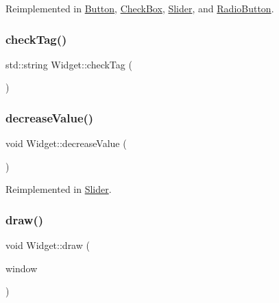 Reimplemented in \mbox{\hyperlink{class_button_a73a90ae2e4101b7d28d24c1c8ec905db}{Button}}, \mbox{\hyperlink{class_check_box_acc7a00bdaa6ee316e7622a52733be294}{Check\+Box}}, \mbox{\hyperlink{class_slider_ab81e90562123cacd8f624b326b9b3f3e}{Slider}}, and \mbox{\hyperlink{class_radio_button_a693581ddb77b4f4c5f8e133eb1369390}{Radio\+Button}}.

\mbox{\label{class_widget_aea8a06cb0344180c07346dbad25a8fdf}} 
\subsubsection{\texorpdfstring{checkTag()}{checkTag()}}
{\footnotesize\ttfamily std\+::string Widget\+::check\+Tag (\begin{DoxyParamCaption}{ }\end{DoxyParamCaption})}

\mbox{\label{class_widget_a1e265a65e224ff231f98dfd490c08c3c}} 
\subsubsection{\texorpdfstring{decreaseValue()}{decreaseValue()}}
{\footnotesize\ttfamily void Widget\+::decrease\+Value (\begin{DoxyParamCaption}{ }\end{DoxyParamCaption})\hspace{0.3cm}{\ttfamily [virtual]}}



Reimplemented in \mbox{\hyperlink{class_slider_ae8bf6bef11bae69bc6a01276b6ad7ddd}{Slider}}.

\mbox{\label{class_widget_ae33a60123dee736ad8ece7277711f3d4}} 
\subsubsection{\texorpdfstring{draw()}{draw()}}
{\footnotesize\ttfamily void Widget\+::draw (\begin{DoxyParamCaption}\item[{sf\+::\+Render\+Window \&}]{window }\end{DoxyParamCaption})\hspace{0.3cm}{\ttfamily [virtual]}}



